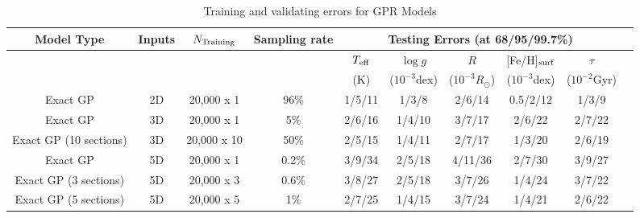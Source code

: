 \begin{table}
	\centering
	\caption{Training and validating errors for GPR Models}
	\label{tab:results}
	\begin{tabular}{cccccccccc}
		\hline
		Model Type&Inputs&$N_{\rm Training}$ &Sampling rate &\multicolumn{5}{c}{Testing Errors (at 68/95/99.7\%)} \\
		 \hline
		 \multicolumn{4}{c}{}& $T_{\rm eff}$ &$\log g$  &$R$  &[Fe/H]$_{\rm surf}$   &$\tau$ \\
		 \multicolumn{4}{c}{}&  (K)& ($10^{-3}$dex) & ($10^{-3}R_{\odot}$)  &  ($10^{-3}$dex)  & ($10^{-2}$Gyr) \\		 
		 \hline
		 Exact GP & 2D & 20,000 x 1 &96\% & 1/5/11 & 1/3/8 & 2/6/14 & 0.5/2/12 &  1/3/9 \\
		 \hline		 
		 Exact GP & 3D & 20,000 x 1 & 5\% & 2/6/16 & 1/4/10 & 3/7/17 &  2/6/22 & 2/7/22 \\
		  Exact GP (10 sections) & 3D & 20,000 x 10 & 50\% & 2/5/15 &1/4/11 & 2/7/17& 1/3/20& 2/6/19\\
		  \hline		 
		 Exact GP & 5D & 20,000 x 1 & 0.2\% & 3/9/34 & 2/5/18 & 4/11/36 & 2/7/30 & 3/9/27  \\
		 Exact GP (3 sections) & 5D& 20,000 x 3 & 0.6\% &  3/8/27 & 2/5/18 & 3/7/26 & 1/4/24 &3/7/22 \\
		 Exact GP (5 sections) & 5D& 20,000 x 5 & 1\% &  2/7/25 & 1/4/15 & 3/7/24 & 1/4/21 &2/6/22 \\

\end{tabular}
\end{table}
